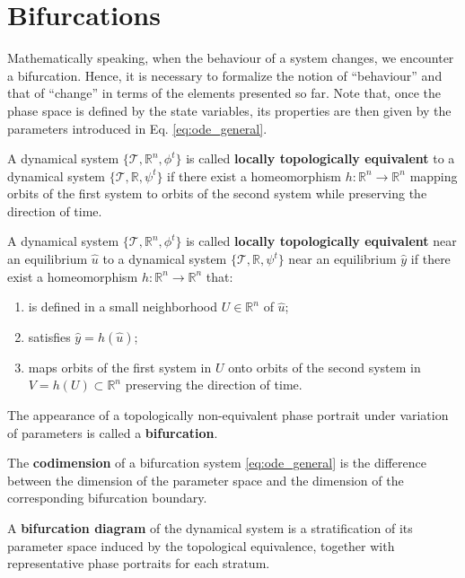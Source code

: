 \tocless\section{Bifurcations}
\label{sec:bif_formal}
Mathematically speaking, when the behaviour of a system changes, we encounter a bifurcation. Hence, it is necessary to formalize the notion of ``behaviour'' and that of ``change'' in terms of the elements presented so far. Note that, once the phase space is defined by the state variables, its properties are then given by the parameters introduced in Eq. \ref{eq:ode_general}.
\begin{definition}
	A dynamical system $\{\mathcal{T}, \mathbb{R}^n, \phi^t\}$ is called \textbf{locally topologically equivalent} to a dynamical system $\{\mathcal{T}, \mathbb{R}, \psi^t\}$ if there exist a homeomorphism $h: \mathbb{R}^n \to \mathbb{R}^n$ mapping orbits of the first system to orbits of the second system while preserving the direction of time.
\end{definition}
\begin{definition}
	A dynamical system $\{\mathcal{T}, \mathbb{R}^n, \phi^t\}$ is called \textbf{locally topologically equivalent} near an equilibrium $\hat{u}$ to a dynamical system $\{\mathcal{T}, \mathbb{R}, \psi^t\}$ near an equilibrium $\hat{y}$ if there exist a homeomorphism $h: \mathbb{R}^n \to \mathbb{R}^n$ that:
	\renewcommand{\theenumi}{\roman{enumi}}%
	\begin{enumerate}
		\item is defined in a small neighborhood $U \in \mathbb{R}^n$ of $\hat{u}$;
		\item satisfies $\hat{y} = h(\hat{u})$;
		\item maps orbits of the first system in $U$ onto orbits of the second system in $V=h(U) \subset \mathbb{R}^n$ preserving the direction of time.
	\end{enumerate}	
\end{definition}
\begin{definition}
	The appearance of a topologically non-equivalent phase portrait under variation of parameters is called a \textbf{bifurcation}.
\end{definition}
\begin{definition}
	The \textbf{codimension} of a bifurcation system \ref{eq:ode_general} is the difference between the dimension of the parameter space and the dimension of the corresponding bifurcation boundary.
\end{definition}
\begin{definition}
	A \textbf{bifurcation diagram} of the dynamical system is a stratification of its parameter space induced by the topological equivalence, together with representative phase portraits for each stratum.
	\label{def:bif_diag}
\end{definition}
